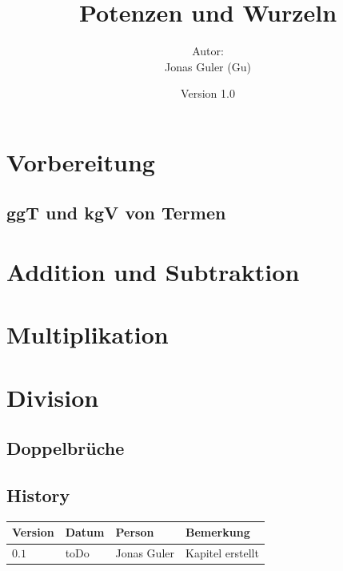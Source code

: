 \documentclass[11pt,oneside]{article}
\newcommand{\Skriptname}{Potenzen und Wurzeln}
\newcommand{\Autor}{Jonas Guler (Gu)}
\begin{document}
\begin{titlepage}
	\clearpage
	\title{\Huge\textbf{\Skriptname} \\[1cm]}
	\author{Autor:\\ \Autor}
	\date{\normalsize {Version 1.0}\\ \datelong}
	\maketitle
    \thispagestyle{empty}
    \vfill
    \tableofcontents
\end{titlepage}
\section{Vorbereitung}
\subsection{ggT und kgV von Termen}

\section{Addition und Subtraktion}

\section{Multiplikation}

\section{Division}
\subsection{Doppelbrüche}


\newpage
\subsection*{History}
\begin{table}[H]
    \centering
    \begin{tabular}{|p{13mm}|p{20mm}|p{30mm}|p{70mm}|}\hline
        Version & Datum & Person & Bemerkung \\\hline
        $0.1$ & toDo & Jonas Guler & Kapitel erstellt \\\hline
    \end{tabular}
\end{table}
\end{document}

